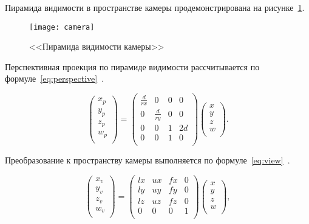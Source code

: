 Пирамида видимости в пространстве камеры продемонстрирована на рисунке~\ref{fig:camera}.

\begin{figure}[H]
	\centering
	\texttt{[image: camera]}
	\caption{<<Пирамида видимости камеры>>}
	\label{fig:camera}
\end{figure}

Перспективная проекция по пирамиде видимости рассчитывается по формуле~\ref{eq:perspective}~\cite{projection}.

\begin{equation}
	\label{eq:perspective}
	\begin{pmatrix}
		x_p \\
		y_p \\
		z_p \\
		w_p \\
	\end{pmatrix} = 
	\begin{pmatrix}
		\frac{d}{rx}  & 0 & 0 & 0 \\
		0 & \frac{d}{ry} & 0 & 0 \\
		0 & 0 & 1 & 2d \\
		0 & 0 & 1 & 0 \\
	\end{pmatrix}
	\begin{pmatrix}
		x \\
		y \\
		z \\
		w \\
	\end{pmatrix}.
\end{equation}

Преобразование к пространству камеры выполняется по формуле~\ref{eq:view}~\cite{view}.

\begin{equation}
	\label{eq:view}
	\begin{pmatrix}
		x_v \\
		y_v \\
		z_v \\
		w_v \\
	\end{pmatrix} = 
	\begin{pmatrix}
		lx & ux & fx & 0 \\
		ly & uy & fy & 0 \\
		lz & uz & fz & 0 \\
		0 & 0 & 0 & 1 \\
	\end{pmatrix}
	\begin{pmatrix}
		x \\
		y \\
		z \\
		w \\
	\end{pmatrix},
\end{equation}

